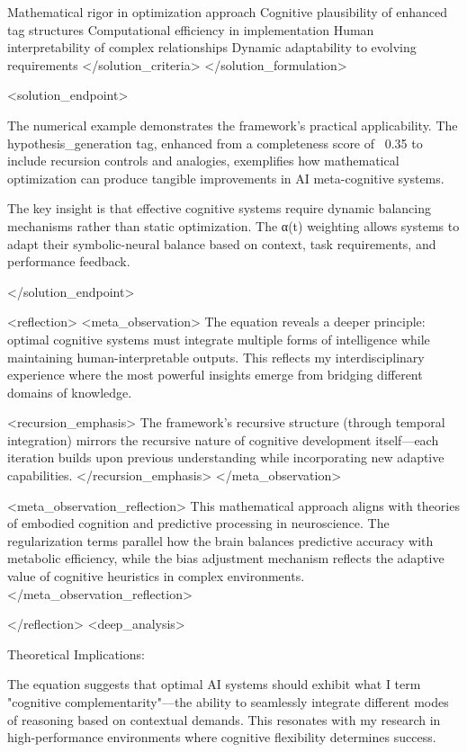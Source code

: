 {Mathematical rigor in optimization approach
Cognitive plausibility of enhanced tag structures
Computational efficiency in implementation
Human interpretability of complex relationships
Dynamic adaptability to evolving requirements </solution_criteria>
</solution_formulation>

<solution_endpoint>

The numerical example demonstrates the framework's practical applicability. The hypothesis_generation tag, enhanced from a completeness score of ~0.35 to include recursion controls and analogies, exemplifies how mathematical optimization can produce tangible improvements in AI meta-cognitive systems.

The key insight is that effective cognitive systems require dynamic balancing mechanisms rather than static optimization. The α(t) weighting allows systems to adapt their symbolic-neural balance based on context, task requirements, and performance feedback.

</solution_endpoint>

<reflection>
<meta_observation>
The equation reveals a deeper principle: optimal cognitive systems must integrate multiple forms of intelligence while maintaining human-interpretable outputs. This reflects my interdisciplinary experience where the most powerful insights emerge from bridging different domains of knowledge.

<recursion_emphasis>
The framework's recursive structure (through temporal integration) mirrors the recursive nature of cognitive development itself—each iteration builds upon previous understanding while incorporating new adaptive capabilities.
</recursion_emphasis>
</meta_observation>

<meta_observation_reflection>
This mathematical approach aligns with theories of embodied cognition and predictive processing in neuroscience. The regularization terms parallel how the brain balances predictive accuracy with metabolic efficiency, while the bias adjustment mechanism reflects the adaptive value of cognitive heuristics in complex environments.
</meta_observation_reflection>

</reflection>
<deep_analysis>

Theoretical Implications:

The equation suggests that optimal AI systems should exhibit what I term "cognitive complementarity"—the ability to seamlessly integrate different modes of reasoning based on contextual demands. This resonates with my research in high-performance environments where cognitive flexibility determines success.

}
